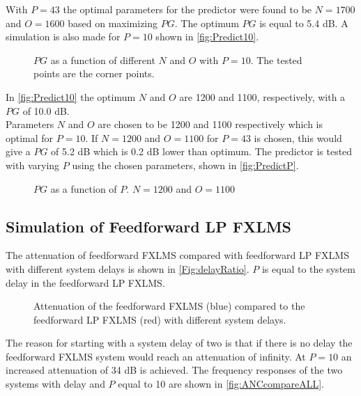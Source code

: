With $P=43$ the optimal parameters for the predictor were found to be $N=1700$ and $O=1600$ based on maximizing $PG$. The optimum $PG$ is equal to 5.4 dB.
A simulation is also made for $P=10$ shown in \autoref{fig:Predict10}.

\begin{figure}[H]
	\centering
	
	\caption{$PG$ as a function of different $N$ and $O$ with $P=10$. The tested points are the corner points.}
	\label{fig:Predict10}
\end{figure}



In \autoref{fig:Predict10} the optimum $N$ and $O$ are 1200 and 1100, respectively, with a $PG$ of 10.0 dB.\\

Parameters $N$ and $O$ are chosen to be 1200 and 1100 respectively which is optimal for $P=10$. If $N=1200$ and $O=1100$ for $P=43$ is chosen, this would give a $PG$ of 5.2 dB which is 0.2 dB lower than optimum.
The predictor is tested with varying $P$ using the chosen parameters, shown in \autoref{fig:PredictP}.

\begin{figure}[H]
	\centering
	
	\caption{$PG$ as a function of $P$. $N=1200$ and $O=1100$}
	\label{fig:PredictP}
\end{figure}



\subsection{Simulation of Feedforward LP FXLMS}
The attenuation of feedforward FXLMS compared with feedforward LP FXLMS with different system delays is shown in \autoref{Fig:delayRatio}. $P$ is equal to the system delay in the feedforward LP FXLMS.
\begin{figure}[H]
	\centering
	
	\caption{Attenuation of the feedforward FXLMS (blue)  compared to the feedforward LP FXLMS (red) with different system delays.}
	\label{Fig:delayRatio}
\end{figure}
 The reason for starting with a system delay of two is that if there is no delay the feedforward FXLMS system would reach an attenuation of infinity. At $P=10$ an increased attenuation of 34 dB is achieved. The frequency responses of the two systems with delay and $P$ equal to 10 are shown in \autoref{fig:ANCcompareALL}.  

